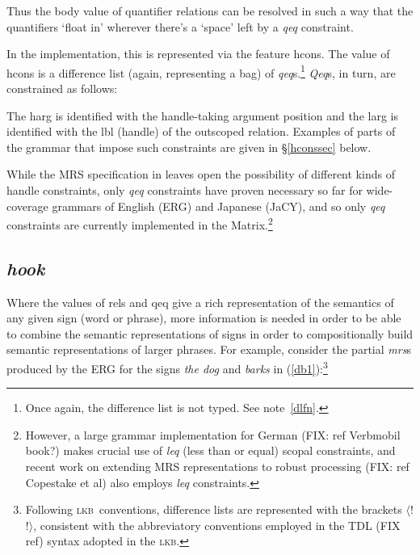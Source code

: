 \documentclass[12pt]{article}
\newcommand{\lkb}{\textsc{lkb}}
\newcommand{\es}{\enumsentence}
\newcommand{\fn}{\footnote}
\begin{document}
\noindent
Thus the {\sc body} value of quantifier relations can be resolved in
such a way that the quantifiers `float in' wherever there's a `space'
left by a {\it qeq} constraint.

In the implementation, this is represented via the feature {\sc
hcons}.  The value of {\sc hcons} is a difference list (again,
representing a bag) of {\it qeq}s.\fn{Once again, the difference list
is not typed.  See note~\ref{dlfn}.}  {\it Qeq}s, in turn, are
constrained as follows:

\es{
\begin{avm}
{\it qeq}: \[ harg & handle\\
	      larg & handle \]
\end{avm}
}

\noindent
The {\sc harg} is identified with the handle-taking argument position
and the {\sc larg} is identified with the {\sc lbl} (handle) of the outscoped
relation.  Examples of parts of the grammar that impose such constraints
are given in \S\ref{hconssec} below.

While the MRS specification in  leaves
open the possibility of different kinds of handle constraints, only
{\it qeq} constraints have proven necessary so far for wide-coverage
grammars of English (ERG) and Japanese (JaCY), and so only
{\it qeq} constraints are currently implemented in the 
Matrix.\footnote{However, a large grammar implementation for German (FIX: ref 
Verbmobil book?) makes crucial use of {\it leq} (less than or equal) scopal
constraints, and recent work on extending MRS representations to robust 
processing (FIX: ref Copestake et al)
also employs {\it leq} constraints.}

\subsection{{\it hook}}
\label{hooksec}

Where the values of {\sc rels} and {\sc qeq} give a rich representation of 
the semantics of any given sign (word or phrase),
more information is needed in order to be able to combine the semantic
representations of signs in order to compositionally build
semantic representations of larger phrases.  For example, consider the
partial {\it mrs}s produced by the ERG for the signs {\it the dog} and 
{\it barks} in
(\ref{db1}):\fn{Following \lkb\ conventions, difference lists are
represented with the brackets $\langle$! !$\rangle$, consistent with the
abbreviatory conventions employed in the TDL (FIX ref)
syntax adopted in the \lkb.}
\end{document}
